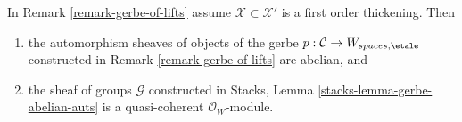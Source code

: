%
\begin{lemma}
\label{lemma-gerbe-of-lifts-first-order}
In Remark \ref{remark-gerbe-of-lifts} assume $\mathcal{X} \subset \mathcal{X}'$
is a first order thickening. Then
\begin{enumerate}
\item the automorphism sheaves of objects of the gerbe
$p : \mathcal{C} \to W_{spaces, \etale}$ constructed
in Remark \ref{remark-gerbe-of-lifts} are abelian, and
\item the sheaf of groups $\mathcal{G}$ constructed in
Stacks, Lemma \ref{stacks-lemma-gerbe-abelian-auts}
is a quasi-coherent $\mathcal{O}_W$-module.
\end{enumerate}
\end{lemma}

